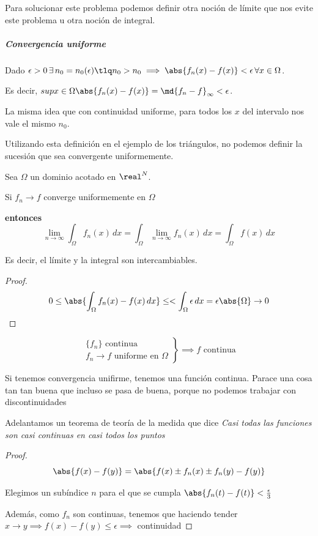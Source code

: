 Para solucionar este problema podemos definir otra noción de límite que nos evite este problema u otra noción de integral.

\subparagraph{\textit{Convergencia uniforme}}

Dado $\epsilon>0\,\exists\,n_0=n_0(\epsilon) \tlq n_0>n_0 \implies \abs{f_n(x) - f(x)} < \epsilon\, \forall x\in\Omega$.

Es decir, ${sup}{x\in\Omega} \abs{f_n(x)-f(x)} = \md{f_n-f}_{\infty} <\epsilon$.

La misma idea que con continuidad uniforme, para todos los $x$ del intervalo nos vale el mismo $n_0$.

Utilizando esta definición en el ejemplo de los triángulos, no podemos definir la sucesión que sea convergente uniformemente.

\begin{theorem}
Sea $\Omega$ un dominio acotado en $\real^N$.

Si $f_n \to f$ converge uniformemente en $\Omega$

\textbf{entonces}
\[\lim_{n\to\infty} \int_{\Omega} f_n(x)\,dx = \int_{\Omega} \lim_{n\to\infty} f_n(x)\,dx = \int_{\Omega} f(x)\,dx\]

Es decir, el límite y la integral son intercambiables.
\end{theorem}

\begin{proof}
\[0\leq\abs{\int_{\Omega}f_n(x) - f(x) \, dx} \leq <\int_{\Omega} \epsilon \,dx =\epsilon\abs{\Omega} \to 0\]
\end{proof}

\begin{theorem}
\[\left.\begin{array}{cc}
\{f_n\} \text{ continua }\\
f_n \to f \text{ uniforme en } \Omega \end{array}
\right\} \implies f \text{ continua}\]
\end{theorem}
\obs Si tenemos convergencia unifirme, tenemos una función continua. Parace una cosa tan tan buena que incluso se pasa de buena, porque no podemos trabajar con discontinuidades

\obs Adelantamos un teorema de teoría de la medida que dice \textit{ Casi todas las funciones son casi continuas en casi todos los puntos}


\begin{proof}
\[\abs{f(x) - f(y)} = \abs{f(x) \pm f_n(x) \pm f_n(y) - f(y)}\]

Elegimos un subíndice $n$ para el que se cumpla $\abs{f_n(t) - f(t)} < \frac{\epsilon}{3}$

Además, como $f_n$ son continuas, tenemos que haciendo tender $x\to y \implies f(x) - f(y) \leq \epsilon \implies$ continuidad
\end{proof}


